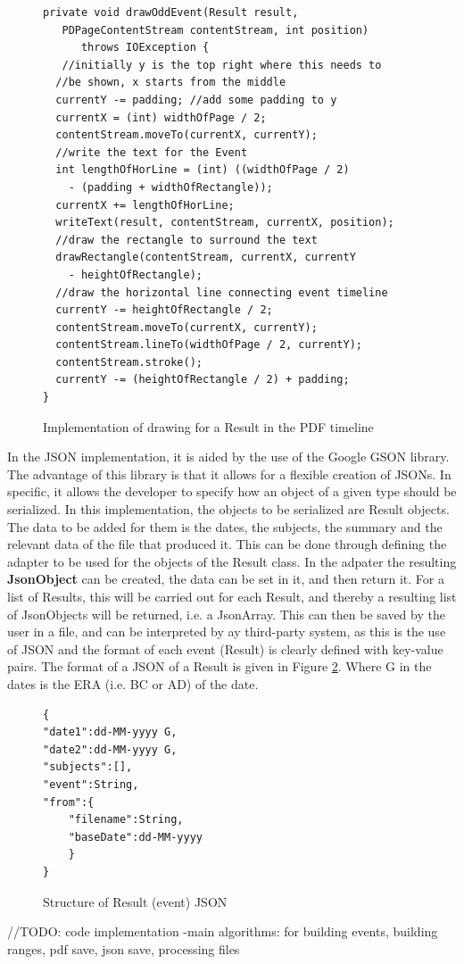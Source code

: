 \begin{figure}
\begin{lstlisting}
private void drawOddEvent(Result result, 
   PDPageContentStream contentStream, int position)
      throws IOException {
   //initially y is the top right where this needs to 
  //be shown, x starts from the middle
  currentY -= padding; //add some padding to y
  currentX = (int) widthOfPage / 2;
  contentStream.moveTo(currentX, currentY);
  //write the text for the Event
  int lengthOfHorLine = (int) ((widthOfPage / 2)
	- (padding + widthOfRectangle));
  currentX += lengthOfHorLine;
  writeText(result, contentStream, currentX, position);
  //draw the rectangle to surround the text
  drawRectangle(contentStream, currentX, currentY 
  	- heightOfRectangle);
  //draw the horizontal line connecting event timeline
  currentY -= heightOfRectangle / 2;
  contentStream.moveTo(currentX, currentY);
  contentStream.lineTo(widthOfPage / 2, currentY);
  contentStream.stroke();
  currentY -= (heightOfRectangle / 2) + padding;
}
\end{lstlisting}
\caption{Implementation of drawing for a Result in the PDF timeline}
\label{fig:drawRecImplemented}
\end{figure}
\par In the JSON implementation, it is aided by the use of the Google GSON library. The advantage of this library is that it allows for a flexible creation of JSONs. In specific, it allows the developer to specify how an object of a given type should  be serialized. In this implementation, the objects to be serialized are Result objects. The data to be added for them is the dates, the subjects, the summary and the relevant data of the file that produced it. This can be done through defining the adapter to be used for the objects of the Result class. In the adpater the resulting \textbf{JsonObject} can be created, the data can be set in it, and then return it. For a list of Results, this will be carried out for each Result, and thereby a resulting list of JsonObjects will be returned, i.e. a JsonArray. This can then be saved by the user in a file, and can be interpreted by ay third-party system, as this is the use of JSON and the format of each event (Result) is clearly defined with key-value pairs. The format of a JSON of a Result is given in Figure \ref{fig:jsonResult}. Where G in the dates is the ERA (i.e. BC or AD) of the date.
\begin{figure}
\begin{lstlisting}
{
"date1":dd-MM-yyyy G,
"date2":dd-MM-yyyy G,
"subjects":[],
"event":String,
"from":{
	"filename":String,
	"baseDate":dd-MM-yyyy
	}
}
\end{lstlisting}
\caption{Structure of Result (event) JSON}
\label{fig:jsonResult}
\end{figure}
//TODO: code implementation
-main algorithms: for building events, building ranges, pdf save, json save, processing files
